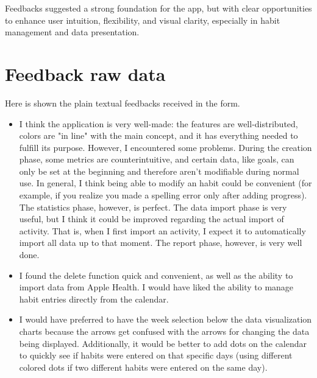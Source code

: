 \documentclass{article}
\begin{document}
Feedbacks suggested a strong foundation for the app, but with clear opportunities to enhance user intuition, flexibility, and visual clarity, especially in habit management and data presentation.

\section{Feedback raw data}

Here is shown the plain textual feedbacks received in the form.

\begin{itemize}
	\item I think the application is very well-made: the features are well-distributed, colors are "in line" with the main concept, and it has everything needed to fulfill its purpose. However, I encountered some problems. During the creation phase, some metrics are counterintuitive, and certain data, like goals, can only be set at the beginning and therefore aren't modifiable during normal use. In general, I think being able to modify an habit could be convenient (for example, if you realize you made a spelling error only after adding progress). The statistics phase, however, is perfect. The data import phase is very useful, but I think it could be improved regarding the actual import of activity. That is, when I first import an activity, I expect it to automatically import all data up to that moment. The report phase, however, is very well done.
	\item I found the delete function quick and convenient, as well as the ability to import data from Apple Health. I would have liked the ability to manage habit entries directly from the calendar.
	\item I would have preferred to have the week selection below the data visualization charts because the arrows get confused with the arrows for changing the data being displayed. Additionally, it would be better to add dots on the calendar to quickly see if habits were entered on that specific days (using different colored dots if two different habits were entered on the same day).

\end{itemize}
\end{document}
